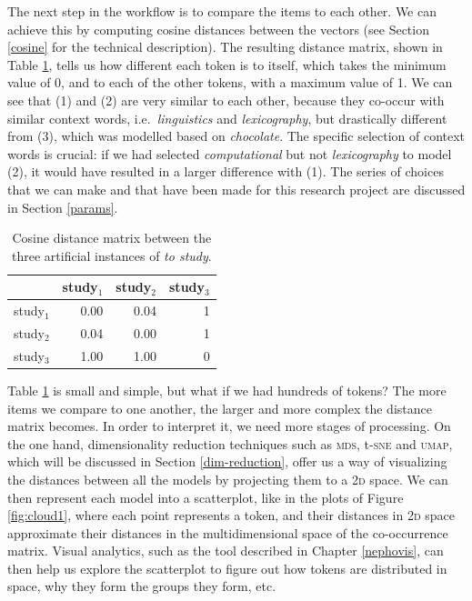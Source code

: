 \documentclass[
]{book}
\begin{document}
The next step in the workflow is to compare the items to each other. We can achieve this by computing cosine distances between the vectors (see Section \ref{cosine} for the technical description). The resulting distance matrix, shown in Table \ref{tab:tokdists}, tells us how different each token is to itself, which takes the minimum value of 0, and to each of the other tokens, with a maximum value of 1. We can see that (1) and (2) are very similar to each other, because they co-occur with similar context words, i.e.~\emph{linguistics} and \emph{lexicography}, but drastically different from (3), which was modelled based on \emph{chocolate}. The specific selection of context words is crucial: if we had selected \emph{computational} but not \emph{lexicography} to model (2), it would have resulted in a larger difference with (1). The series of choices that we can make and that have been made for this research project are discussed in Section \ref{params}.



\begin{table}

\caption{\label{tab:tokdists}Cosine distance matrix between the three artificial instances of \emph{to study}.}
\centering
\begin{tabular}[t]{lrrr}
\toprule
  & study$_1$ & study$_2$ & study$_3$\\
\midrule
study$_1$ & 0.00 & 0.04 & 1\\
study$_2$ & 0.04 & 0.00 & 1\\
study$_3$ & 1.00 & 1.00 & 0\\
\bottomrule
\end{tabular}
\end{table}

Table \ref{tab:tokdists} is small and simple, but what if we had hundreds of tokens? The more items we compare to one another, the larger and more complex the distance matrix becomes. In order to interpret it, we need more stages of processing. On the one hand, dimensionality reduction techniques such as \textsc{mds}, t-\textsc{sne} and \textsc{umap}, which will be discussed in Section \ref{dim-reduction}, offer us a way of visualizing the distances between all the models by projecting them to a \textsc{2d} space. We can then represent each model into a scatterplot, like in the plots of Figure \ref{fig:cloud1}, where each point represents a token, and their distances in \textsc{2d} space approximate their distances in the multidimensional space of the co-occurrence matrix. Visual analytics, such as the tool described in Chapter \ref{nephovis}, can then help us explore the scatterplot to figure out how tokens are distributed in space, why they form the groups they form, etc.
\end{document}
